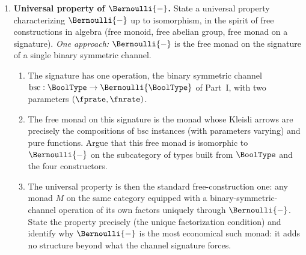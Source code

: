 \begin{enumerate}
\item \exstarstarstar
\label{ex:ch13-10}
\textbf{Universal property of $\Bernoulli{-}$.}
State a universal property characterizing $\Bernoulli{-}$ up to
isomorphism, in the spirit of free constructions in algebra (free
monoid, free abelian group, free monad on a signature).
\emph{One approach:} $\Bernoulli{-}$ is the free monad on the
signature of a single binary symmetric channel.
\begin{enumerate}
  \item[(a)] The signature has one operation, the binary symmetric
    channel $\mathrm{bsc} : \BoolType \to \Bernoulli{\BoolType}$
    of Part~I, with two parameters $(\fprate, \fnrate)$.
  \item[(b)] The free monad on this signature is the monad whose
    Kleisli arrows are precisely the compositions of $\mathrm{bsc}$
    instances (with parameters varying) and pure functions. Argue
    that this free monad is isomorphic to $\Bernoulli{-}$ on the
    subcategory of types built from $\BoolType$ and the four
    constructors.
  \item[(c)] The universal property is then the standard
    free-construction one: any monad $M$ on the same category
    equipped with a binary-symmetric-channel operation of its own
    factors uniquely through $\Bernoulli{-}$. State the property
    precisely (the unique factorization condition) and identify
    why $\Bernoulli{-}$ is the most economical such monad: it adds
    no structure beyond what the channel signature forces.
\end{enumerate}


\end{enumerate}
